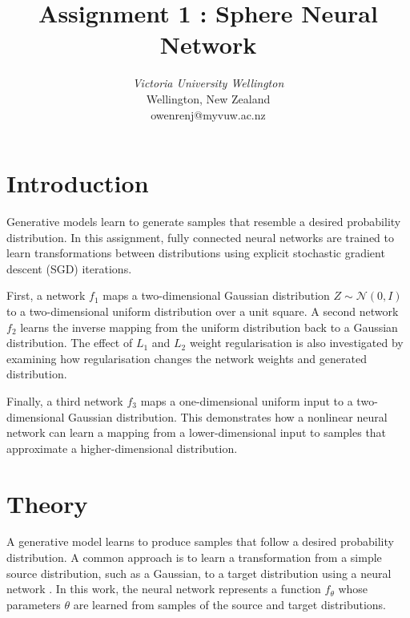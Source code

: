 \documentclass[conference,a4paper]{IEEEtran}
\begin{document}
\title{Assignment 1 : Sphere Neural Network %
}

\author{
\textit{Victoria University Wellington}\\
Wellington, New Zealand\\
owenrenj@myvuw.ac.nz}
\graphicspath{{../../}}
\maketitle

\section{Introduction}

Generative models learn to generate samples that resemble a desired probability distribution. In this assignment, fully connected neural networks are trained to learn transformations between distributions using explicit stochastic gradient descent (SGD) iterations.

First, a network $f_1$ maps a two-dimensional Gaussian distribution $Z \sim \mathcal{N}(0,I)$ to a two-dimensional uniform distribution over a unit square. A second network $f_2$ learns the inverse mapping from the uniform distribution back to a Gaussian distribution. The effect of $L_1$ and $L_2$ weight regularisation is also investigated by examining how regularisation changes the network weights and generated distribution.

Finally, a third network $f_3$ maps a one-dimensional uniform input to a two-dimensional Gaussian distribution. This demonstrates how a nonlinear neural network can learn a mapping from a lower-dimensional input to samples that approximate a higher-dimensional distribution.

\section{Theory}

A generative model learns to produce samples that follow a desired probability distribution. A common approach is to learn a transformation from a simple source distribution, such as a Gaussian, to a target distribution using a neural network \cite{goodfellow2016}. In this work, the neural network represents a function $f_\theta$ whose parameters $\theta$ are learned from samples of the source and target distributions.
\end{document}
